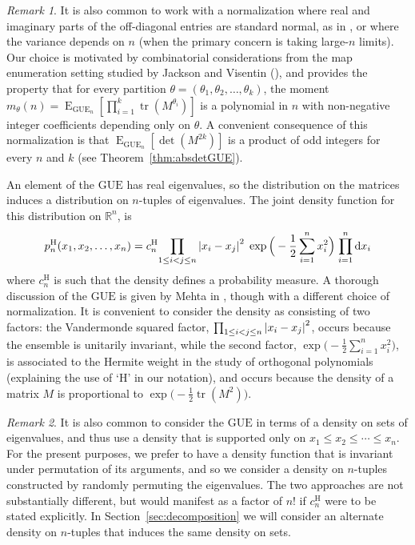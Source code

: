 \documentclass[pdftex, oneside, 10pt, letterpaper]{amsart}
\theoremstyle{plain}
\theoremstyle{definition}
\theoremstyle{remark}
\newtheorem*{rem}{Remark}
\begin{document}
\begin{rem}
  It is also common to work with a normalization where real and
  imaginary parts of the off-diagonal entries are standard normal, as
  in \cite{Mehta, MeNo}, or where the variance depends on $n$ (when
  the primary concern is taking large-$n$ limits).  Our choice is
  motivated by combinatorial considerations from the map enumeration
  setting studied by Jackson and Visentin (\cite{JV-Eulerian}), and
  provides the property that for every partition
  $\theta=(\theta_1,\theta_2,\dotsc,\theta_k)$, the moment
  $m_\theta(n)={\operatorname{E}_{{\ensuremath{\mathrm{GUE}}}_n}\left[{\prod_{i=1}^k\operatorname{tr}(M^{\theta_i})}\right]}$ is a
  polynomial in $n$ with non-negative integer coefficients depending
  only on $\theta$.  A convenient consequence of this normalization is
  that ${\operatorname{E}_{{\ensuremath{\mathrm{GUE}}}_n}\left[{\det(M^{2k})}\right]}$ is a product of odd integers for
  every $n$ and $k$ (see Theorem~\ref{thm:absdetGUE}).
\end{rem}

An element of the {\ensuremath{\mathrm{GUE}}}{} has real eigenvalues, so the distribution on
the matrices induces a distribution on $n$-tuples of eigenvalues.  The
joint density function for this distribution on $\mathbb{R}^n$, is
\begin{equation}\label{eqn:GUEdensity}
  p_n^{\mathrm{H}}(x_1,x_2,\dotsc,x_n) =
  c_{n}^{\mathrm{H}}{\prod_{1\leq i<j\leq{}n}{{\ifx\relax{}\relax\else\fi}{{}}\lvert{x_i-x_j}{{}}\rvert}^2}
  \;\exp\Big(-\frac12\sum_{i=1}^n x_i^2\Big)
  {\;\prod_{i={1}}^{{n}} \mathrm{d}{{x}}_i}
\end{equation}
where $c_{n}^{\mathrm{H}}$ is such that the density defines a
probability measure.  A thorough discussion of the {\ensuremath{\mathrm{GUE}}}{} is given by
Mehta in \cite{Mehta}, though with a different choice of
normalization.  It is convenient to consider the density as consisting
of two factors: the Vandermonde squared factor,
$\prod_{1\leq{}i<j\leq{}n}{{\ifx\relax{}\relax\else\fi}{{}}\lvert{x_i-x_j}{{}}\rvert}^2$, occurs because the
ensemble is unitarily invariant, while the second factor,
$\exp\big(-\frac12\sum_{i=1}^n x_i^2\big)$, is associated to the
Hermite weight in the study of orthogonal polynomials (explaining the
use of `$\mathrm{H}$' in our notation), and occurs because the density
of a matrix $M$ is proportional to $\exp\big(-\frac12\operatorname{tr}(M^2)\big)$.

\begin{rem}
  It is also common to consider the {\ensuremath{\mathrm{GUE}}}{} in terms of a density on
  sets of eigenvalues, and thus use a density that is supported only
  on $x_1\leq{}x_2\leq\dotsm\leq{}x_n$.  For the present purposes, we
  prefer to have a density function that is invariant under
  permutation of its arguments, and so we consider a density on
  $n$-tuples constructed by randomly permuting the eigenvalues.  The
  two approaches are not substantially different, but would manifest
  as a factor of $n!$ if $c_n^{\mathrm{H}}$ were to be stated
  explicitly.  In Section~\ref{sec:decomposition} we will consider an
  alternate density on $n$-tuples that induces the same density on
  sets.
\end{rem}
\end{document}
